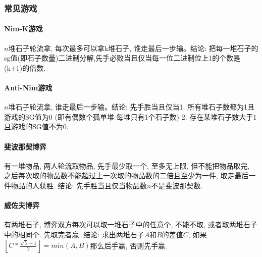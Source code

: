\begin{small}
\subsubsection{常见游戏}
\begin{multicols}{2}
\paragraph{Nim-K游戏}$n$堆石子轮流拿, 每次最多可以拿k堆石子, 谁走最后一步输。结论: 把每一堆石子的sg值(即石子数量)二进制分解,先手必败当且仅当每一位二进制位上1的个数是(k+1)的倍数. 
\paragraph{Anti-Nim游戏}$n$堆石子轮流拿, 谁走最后一步输。结论: 先手胜当且仅当1. 所有堆石子数都为1且游戏的SG值为0 (即有偶数个孤单堆-每堆只有1个石子数) 2. 存在某堆石子数大于1且游戏的SG值不为0.
\paragraph{斐波那契博弈}有一堆物品, 两人轮流取物品, 先手最少取一个, 至多无上限, 但不能把物品取完, 之后每次取的物品数不能超过上一次取的物品数的二倍且至少为一件, 取走最后一件物品的人获胜. 结论: 先手胜当且仅当物品数$n$不是斐波那契数. 
\paragraph{威佐夫博弈}有两堆石子, 博弈双方每次可以取一堆石子中的任意个, 不能不取, 或者取两堆石子中的相同个. 先取完者赢. 结论: 求出两堆石子$A$和$B$的差值$C$, 如果$\left\lfloor C*\frac{\sqrt{5}+1}{2}\right\rfloor=min(A,B)$那么后手赢, 否则先手赢. 

\end{multicols}
\end{small}
